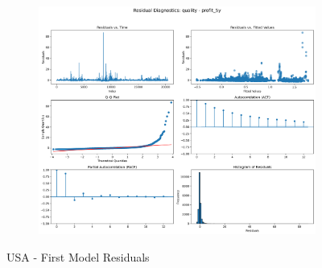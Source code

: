 \documentclass[11pt,english,a4paper,hidelinks]{book}
\begin{document}
\begin{figure}[H]
\begin{subfigure}[b]{0.32\textwidth}
    \end{subfigure}
    \hfill
    \begin{subfigure}[b]{0.32\textwidth}
        \centering
        \includegraphics[width=\textwidth]{images/code/models/linear_regression/first_model/USA/quality_profit_5y_residuals.png}
    \end{subfigure}
    \caption{USA - First Model Residuals}
    \label{fig:linear_regression_USA_residues}
\end{figure}
\end{document}
